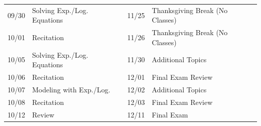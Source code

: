 \documentclass[11pt,letterpaper]{article}
\begin{document}
\begin{table}[!ht]
{\begin{tabular}{ll || ll}
	09/30 & Solving Exp./Log. Equations & 11/25 & Thanksgiving Break (No Classes) \\
	10/01 & Recitation & 11/26 & Thanksgiving Break (No Classes) \\
	10/05 & Solving Exp./Log. Equations & 11/30 & Additional Topics \\
	10/06 & Recitation & 12/01 & Final Exam Review \\
	10/07 & Modeling with Exp./Log. & 12/02 & Additional Topics \\
	10/08 & Recitation & 12/03 & Final Exam Review \\
	10/12 & Review & 12/11 & Final Exam
        \end{tabular}
        }
        \end{table}
\end{document}
